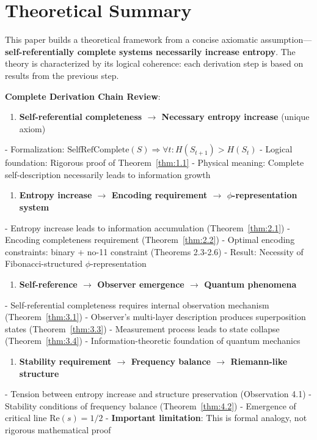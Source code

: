 
\section{Theoretical Summary}
\label{sec:ch08_conclusion:theoretical-summary}

This paper builds a theoretical framework from a concise axiomatic assumption---\textbf{self-referentially complete systems necessarily increase entropy}. The theory is characterized by its logical coherence: each derivation step is based on results from the previous step.

\textbf{Complete Derivation Chain Review}:

\begin{enumerate}
\item \textbf{Self-referential completeness $\rightarrow$ Necessary entropy increase} (unique axiom)
\end{enumerate}
   - Formalization: $\text{SelfRefComplete}(S) \Rightarrow \forall t: H(S_{t+1}) > H(S_t)$
   - Logical foundation: Rigorous proof of Theorem~\ref{thm:1.1}
   - Physical meaning: Complete self-description necessarily leads to information growth

\begin{enumerate}
\item \textbf{Entropy increase $\rightarrow$ Encoding requirement $\rightarrow$ $\phi$-representation system}
\end{enumerate}
   - Entropy increase leads to information accumulation (Theorem~\ref{thm:2.1})
   - Encoding completeness requirement (Theorem~\ref{thm:2.2})
   - Optimal encoding constraints: binary + no-11 constraint (Theorems 2.3-2.6)
   - Result: Necessity of Fibonacci-structured $\phi$-representation

\begin{enumerate}
\item \textbf{Self-reference $\rightarrow$ Observer emergence $\rightarrow$ Quantum phenomena}
\end{enumerate}
   - Self-referential completeness requires internal observation mechanism (Theorem~\ref{thm:3.1})
   - Observer's multi-layer description produces superposition states (Theorem~\ref{thm:3.3})
   - Measurement process leads to state collapse (Theorem~\ref{thm:3.4})
   - Information-theoretic foundation of quantum mechanics

\begin{enumerate}
\item \textbf{Stability requirement $\rightarrow$ Frequency balance $\rightarrow$ Riemann-like structure}
\end{enumerate}
   - Tension between entropy increase and structure preservation (Observation 4.1)
   - Stability conditions of frequency balance (Theorem~\ref{thm:4.2})
   - Emergence of critical line $\text{Re}(s)=1/2$
   - \textbf{Important limitation}: This is formal analogy, not rigorous mathematical proof

